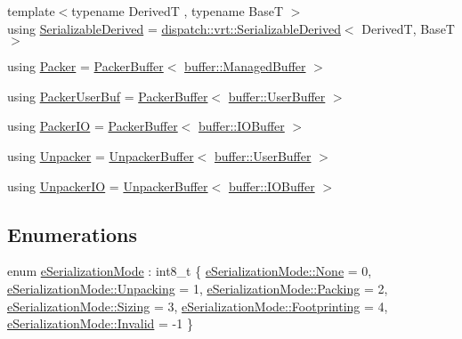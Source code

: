 \begin{DoxyCompactItemize}
{\footnotesize template$<$typename DerivedT , typename BaseT $>$ }\\using \hyperlink{namespacecheckpoint_a9c4afb2c8d1bc1f58b9e158d64331d65}{Serializable\+Derived} = \hyperlink{structcheckpoint_1_1dispatch_1_1vrt_1_1_serializable_derived}{dispatch\+::vrt\+::\+Serializable\+Derived}$<$ DerivedT, BaseT $>$
\item 
using \hyperlink{namespacecheckpoint_ad744c208c7b1da6ee19c10d071e74f7d}{Packer} = \hyperlink{structcheckpoint_1_1_packer_buffer}{Packer\+Buffer}$<$ \hyperlink{structcheckpoint_1_1buffer_1_1_managed_buffer}{buffer\+::\+Managed\+Buffer} $>$
\item 
using \hyperlink{namespacecheckpoint_a72c31e3d94e3b4d05bca5972bacc536a}{Packer\+User\+Buf} = \hyperlink{structcheckpoint_1_1_packer_buffer}{Packer\+Buffer}$<$ \hyperlink{structcheckpoint_1_1buffer_1_1_user_buffer}{buffer\+::\+User\+Buffer} $>$
\item 
using \hyperlink{namespacecheckpoint_a0c8b3f2f174fd1076b410c7a2128919b}{Packer\+IO} = \hyperlink{structcheckpoint_1_1_packer_buffer}{Packer\+Buffer}$<$ \hyperlink{structcheckpoint_1_1buffer_1_1_i_o_buffer}{buffer\+::\+I\+O\+Buffer} $>$
\item 
using \hyperlink{namespacecheckpoint_af36cfec8b3ef7476bb97b3b12908370d}{Unpacker} = \hyperlink{structcheckpoint_1_1_unpacker_buffer}{Unpacker\+Buffer}$<$ \hyperlink{structcheckpoint_1_1buffer_1_1_user_buffer}{buffer\+::\+User\+Buffer} $>$
\item 
using \hyperlink{namespacecheckpoint_a0efc06d99dce79e452b9d1b503059a74}{Unpacker\+IO} = \hyperlink{structcheckpoint_1_1_unpacker_buffer}{Unpacker\+Buffer}$<$ \hyperlink{structcheckpoint_1_1buffer_1_1_i_o_buffer}{buffer\+::\+I\+O\+Buffer} $>$
\end{DoxyCompactItemize}
\subsection*{Enumerations}
\begin{DoxyCompactItemize}
\item 
enum \hyperlink{namespacecheckpoint_ae2509499ccd8b1dc48fb535bf8aa3059}{e\+Serialization\+Mode} \+: int8\+\_\+t \{ \newline
\hyperlink{namespacecheckpoint_ae2509499ccd8b1dc48fb535bf8aa3059a6adf97f83acf6453d4a6a4b1070f3754}{e\+Serialization\+Mode\+::\+None} = 0, 
\hyperlink{namespacecheckpoint_ae2509499ccd8b1dc48fb535bf8aa3059a9b87ab5a4e2e99d758991f06cad9c3bf}{e\+Serialization\+Mode\+::\+Unpacking} = 1, 
\hyperlink{namespacecheckpoint_ae2509499ccd8b1dc48fb535bf8aa3059ac46192253e8458f209a350a132cfc876}{e\+Serialization\+Mode\+::\+Packing} = 2, 
\hyperlink{namespacecheckpoint_ae2509499ccd8b1dc48fb535bf8aa3059a92672a7a2b909945fbfa9f44f057c7a1}{e\+Serialization\+Mode\+::\+Sizing} = 3, 
\newline
\hyperlink{namespacecheckpoint_ae2509499ccd8b1dc48fb535bf8aa3059afa42c5852085bf97b53b351ba4fcc474}{e\+Serialization\+Mode\+::\+Footprinting} = 4, 
\hyperlink{namespacecheckpoint_ae2509499ccd8b1dc48fb535bf8aa3059a4bbb8f967da6d1a610596d7257179c2b}{e\+Serialization\+Mode\+::\+Invalid} = -\/1
 \}
\end{DoxyCompactItemize}
